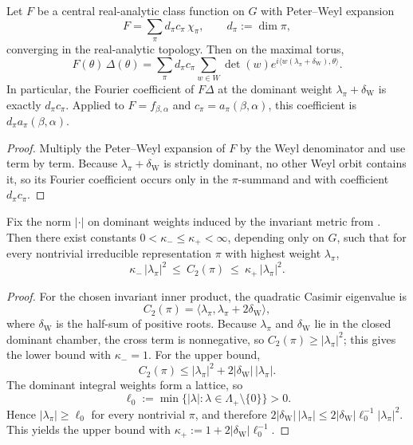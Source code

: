 \begin{lemma}\label{lem:A1_weyl_denominator_coeff_extract}
Let $F$ be a central real-analytic class function on $G$ with Peter--Weyl expansion
\[
F=\sum_{\pi} d_\pi c_\pi\,\chi_\pi,
\qquad d_\pi:=\dim\pi,
\]
converging in the real-analytic topology.
Then on the maximal torus,
\begin{equation}\label{eq:A1_denominator_coeff_extract}
F(\theta)\,\Delta(\theta)
=
\sum_{\pi} d_\pi c_\pi
\sum_{w\in W}\det(w)e^{i\langle w(\lambda_\pi+\delta_{\mathrm W}),\theta\rangle}.
\end{equation}
In particular, the Fourier coefficient of $F\Delta$ at the dominant weight $\lambda_\pi+\delta_{\mathrm W}$ is exactly $d_\pi c_\pi$.
Applied to $F=f_{\beta,\alpha}$ and $c_\pi=a_\pi(\beta,\alpha)$, this coefficient is $d_\pi a_\pi(\beta,\alpha)$.
\end{lemma}

\begin{proof}
Multiply the Peter--Weyl expansion of $F$ by the Weyl denominator and use  term by term.
Because $\lambda_\pi+\delta_{\mathrm W}$ is strictly dominant, no other Weyl orbit contains it, so its Fourier coefficient occurs only in the $\pi$-summand and with coefficient $d_\pi c_\pi$.
\end{proof}

\begin{lemma}\label{lem:A1_weight_casimir_compare}
Fix the norm $|\cdot|$ on dominant weights induced by the invariant metric from .
Then there exist constants $0<\kappa_-\le \kappa_+<\infty$, depending only on $G$, such that for every nontrivial irreducible representation $\pi$ with highest weight $\lambda_\pi$,
\begin{equation}\label{eq:A1_weight_casimir_compare}
\kappa_-\,|\lambda_\pi|^2\ \le\ C_2(\pi)\ \le\ \kappa_+\,|\lambda_\pi|^2.
\end{equation}
\end{lemma}

\begin{proof}
For the chosen invariant inner product, the quadratic Casimir eigenvalue is
\[
C_2(\pi)=\langle \lambda_\pi,\lambda_\pi+2\delta_{\mathrm W}\rangle,
\]
where $\delta_{\mathrm W}$ is the half-sum of positive roots.
Because $\lambda_\pi$ and $\delta_{\mathrm W}$ lie in the closed dominant chamber, the cross term is nonnegative, so
$C_2(\pi)\ge |\lambda_\pi|^2$; this gives the lower bound with $\kappa_-=1$.
For the upper bound,
\[
C_2(\pi)\le |\lambda_\pi|^2+2|\delta_{\mathrm W}|\,|\lambda_\pi|.
\]
The dominant integral weights form a lattice, so
\[
\ell_0:=\min\{|\lambda|:\lambda\in\Lambda_+\setminus\{0\}\}>0.
\]
Hence $|\lambda_\pi|\ge \ell_0$ for every nontrivial $\pi$, and therefore
$2|\delta_{\mathrm W}|\,|\lambda_\pi|\le 2|\delta_{\mathrm W}|\ell_0^{-1}|\lambda_\pi|^2$.
This yields the upper bound with $\kappa_+:=1+2|\delta_{\mathrm W}|\ell_0^{-1}$.
\end{proof}

